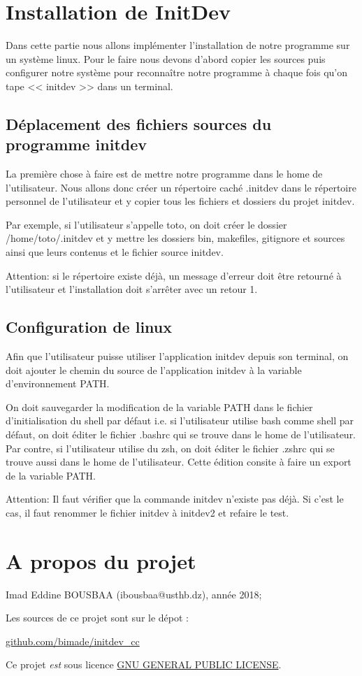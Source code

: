 \documentclass[10pt,a4paper]{article}
\begin{document}
\section{Installation de InitDev}
\label{sec:insl}
Dans cette partie nous allons implémenter l'installation de notre programme sur un système linux. Pour le faire nous devons d'abord copier les sources puis configurer notre système pour reconnaître notre programme à chaque fois qu'on tape << initdev >> dans un terminal.

\subsection{Déplacement des fichiers sources du programme initdev}   
La première chose à faire est de mettre notre programme dans le home de l'utilisateur. Nous allons donc créer un répertoire caché .initdev dans le répertoire personnel de l'utilisateur et y copier tous les fichiers et dossiers du projet initdev. 

Par exemple, si l'utilisateur s'appelle toto, on doit créer le dossier /home/toto/.initdev et y mettre les dossiers bin, makefiles, gitignore et sources ainsi que leurs contenus et le fichier source initdev. 

Attention: si le répertoire existe déjà, un message d'erreur doit être retourné à l'utilisateur et l'installation doit s'arrêter avec un retour 1.

\subsection{Configuration de linux}

Afin que l'utilisateur puisse utiliser l'application initdev depuis son terminal, on doit ajouter le chemin du source de l'application initdev à la variable d'environnement PATH. 

On doit sauvegarder la modification de la variable PATH dans le fichier d'initialisation du shell par défaut i.e. si l'utilisateur utilise bash comme shell par défaut, on doit éditer le fichier .bashrc qui se trouve dans le home de l'utilisateur. Par contre, si l'utilisateur utilise du zsh, on doit éditer le fichier .zshrc qui se trouve aussi dans le home de l'utilisateur. Cette édition consite à faire un export de la variable PATH.

Attention: Il faut vérifier que la commande initdev n'existe pas déjà. Si c'est le cas, il faut renommer le fichier initdev à initdev2 et refaire le test.

\section*{A propos du projet}
Imad Eddine BOUSBAA (ibousbaa@usthb.dz), année 2018;

Les sources de ce projet sont sur le dépot :

  \begin{center}\url{github.com/bimade/initdev_cc}\end{center}

  Ce projet \emph{est} sous licence \href{https://www.gnu.org/licenses/gpl-3.0.html}{GNU GENERAL PUBLIC LICENSE}.
\end{document}
